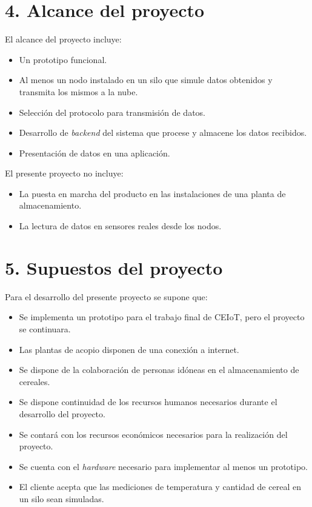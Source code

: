 \documentclass[
11pt, %
]{charter}
\begin{document}
\section{4. Alcance del proyecto}
\label{sec:alcance}

El alcance del proyecto incluye:

\begin{itemize}
 \item Un prototipo funcional. 
 \item Al menos un nodo instalado en un silo que simule datos obtenidos y transmita los mismos a la nube. 
 \item Selección del protocolo para transmisión de datos. 
 \item Desarrollo de \textit{backend} del sistema que procese y almacene los datos recibidos.
 \item Presentación de datos en una aplicación.
\end{itemize}

El presente proyecto no incluye: 

\begin{itemize}
 \item La puesta en marcha del producto en las instalaciones de una planta de almacenamiento.
 \item La lectura de datos en sensores reales desde los nodos.
\end{itemize}




\section{5. Supuestos del proyecto}
\label{sec:supuestos}

Para el desarrollo del presente proyecto se supone que: 

\begin{itemize}
	\item Se implementa un prototipo para el trabajo final de CEIoT, pero el proyecto se continuara. 
	\item Las plantas de acopio disponen de una conexión a internet. 
	\item Se dispone de la colaboración de personas idóneas en el almacenamiento de cereales.
	\item Se dispone continuidad de los recursos humanos necesarios durante el desarrollo del proyecto. 
	\item Se contará con los recursos económicos necesarios para la realización del proyecto. 
	\item Se cuenta con el \textit{hardware} necesario para implementar al menos un prototipo.
	\item El cliente acepta que las mediciones de temperatura y cantidad de cereal en un silo sean simuladas. 
\end{itemize}
\end{document}
